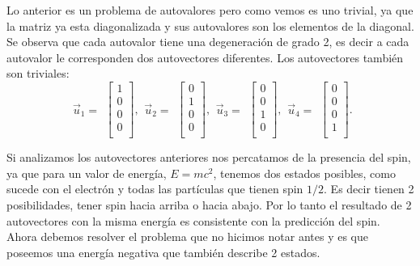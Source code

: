 \documentclass[twocolumn]{article}
\begin{document}
Lo anterior es un problema de autovalores pero como vemos es uno trivial, ya que la matriz ya esta diagonalizada y sus autovalores son los elementos de la diagonal. Se observa que cada autovalor tiene una degeneración de grado 2, es decir a cada autovalor le corresponden dos autovectores diferentes. Los autovectores también son triviales:
\begin{equation}
\begin{matrix}
\Vec{u}_1=
\end{matrix}
\begin{bmatrix}
1  \\
0  \\
0  \\
0  \\
\end{bmatrix}
,
\begin{matrix}
\Vec{u}_2=
\end{matrix}
\begin{bmatrix}
0  \\
1  \\
0  \\
0  \\
\end{bmatrix}
,
\begin{matrix}
\Vec{u}_3=
\end{matrix}
\begin{bmatrix}
0  \\
0  \\
1  \\
0  \\
\end{bmatrix}
,
\begin{matrix}
\Vec{u}_4=
\end{matrix}
\begin{bmatrix}
0  \\
0  \\
0  \\
1  \\
\end{bmatrix}
.
\end{equation}

Si analizamos los autovectores anteriores nos percatamos de la presencia del spin, ya que para un valor de energía, $E=mc^2$, tenemos dos estados posibles, como sucede con el electrón y todas las partículas que tienen spin $1/2$. Es decir tienen 2 posibilidades, tener spin hacia arriba o hacia abajo. Por lo tanto el resultado de 2 autovectores con la misma energía es consistente con la predicción del spin. Ahora debemos resolver el problema que no hicimos notar antes y es que poseemos una energía negativa que también describe 2 estados.
\end{document}
